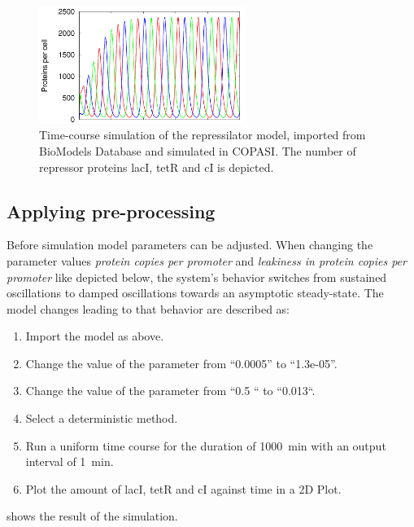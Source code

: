 \begin{figure}[ht]
	\centering
	\includegraphics[width=0.6\textwidth]{examples/repressilator/rep_tc}
	\caption{Time-course simulation of the repressilator model, imported from BioModels Database and simulated in COPASI. The number of repressor proteins lacI, tetR and cI is depicted.}
	\label{fig:rep_tc}
\end{figure}


\subsection{Applying pre-processing}
\label{sec:preprocessing}
Before simulation model parameters can be adjusted. When changing the parameter values \emph{protein copies per promoter}  and \emph{leakiness in protein copies per promoter}  like depicted below, the system's behavior switches from sustained oscillations to damped oscillations towards an asymptotic steady-state. The model changes leading to that behavior are described as: 

\begin{enumerate}
	\item{Import the model as above.}
	\item{Change the value of the parameter  from “0.0005” to “1.3e-05”.}
	\item{Change the value of the parameter  from “0.5 “ to “0.013“.}
	\item{Select a deterministic method.}
	\item{Run a uniform time course for the duration of 1000~min with an output interval of 1~min.}
	\item Plot the amount of lacI, tetR and cI against time in a 2D Plot.
\end{enumerate}

 shows the result of the simulation.

